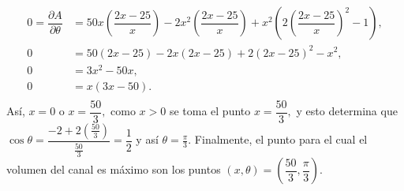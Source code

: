 \begin{prob}
\begin{myproof}
\begin{align*}
0=\dfrac{\partial A}{\partial \theta}&=50x\left(\dfrac{2x-25}{x}\right)-2x^2\left(\dfrac{2x-25}{x}\right)+x^2\left(2\left(\dfrac{2x-25}{x}\right)^{2}-1\right),\\
0&=50\left(2x-25\right)-2x\left(2x-25\right)+2\left( 2x-25 \right)^2-x^2,\\
0&=3x^2-50x,\\
0&=x(3x-50).\\
\end{align*}
Así, $x=0$  o $x=\dfrac{50}{3},$ como $x>0$ se toma el punto $x=\dfrac{50}{3},$ y esto determina que $\cos \theta =\dfrac{-2+2\left( \frac{50}{3} \right)}{\frac{50}{3}}=\dfrac{1}{2}$  y así $\theta=\frac{\pi}{3}.$ 
Finalmente, el punto para el cual el volumen del canal es máximo son los puntos $(x,\theta)=\left(\dfrac{50}{3},\dfrac{\pi}{3}\right).$ 
\end{myproof}
\end{prob}

